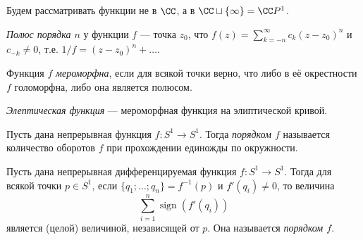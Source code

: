 \documentclass[12pt,a4paper]{article}
\DeclareMathOperator{\sign}{sign}
\begin{document}
    Будем рассматривать функции не в $\CC$, а в $\CC \sqcup \{\infty\} = \CC P^1$.

    \begin{definition}
        \emph{Полюс порядка $n$} у функции $f$ --- точка $z_0$, что $f(z) = \sum_{k=-n}^\infty c_k (z - z_0)^n$ и $c_{-k} \neq 0$, т.е. $1/f = (z - z_0)^n + \dots$. 
    \end{definition}

    \begin{definition}
        Функция $f$ \emph{мероморфна}, если для всякой точки верно, что либо в её окрестности $f$ голоморфна, либо она является полюсом.
    \end{definition}

    \begin{definition}
        \emph{Элептическая функция} --- мероморфная функция на элиптической кривой.
    \end{definition}

    \begin{definition}
        Пусть дана непрерывная функция $f: S^1 \to S^1$. Тогда \emph{порядком $f$} называется количество оборотов $f$ при прохождении единожды по окружности.
    \end{definition}

    \begin{definition}
        Пусть дана непрерывная дифференцируемая функция $f: S^1 \to S^1$. Тогда для всякой точки $p \in S^1$, если $\{q_1; \dots; q_n\} = f^{-1}(p)$ и $f'(q_i) \neq 0$, то величина
        \[\sum_{i=1}^n \sign(f'(q_i))\]
        является (целой) величиной, независящей от $p$. Она называется \emph{порядком $f$}.
    \end{definition}
\end{document}
